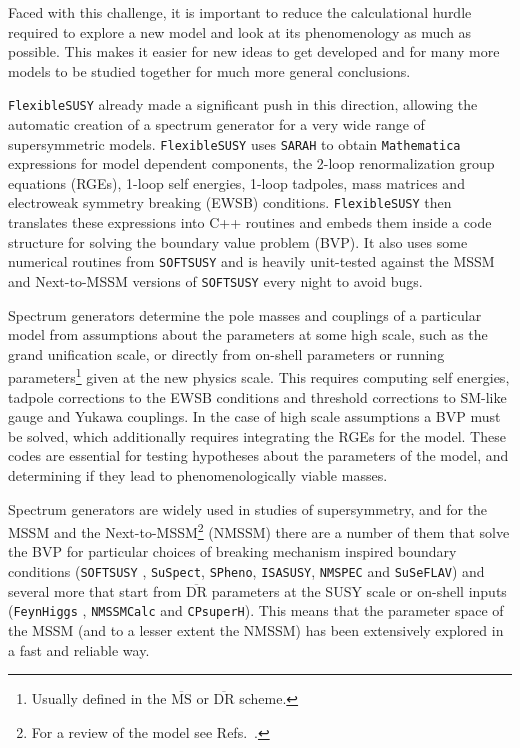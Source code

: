 \documentclass[final,3p,11pt,pdflatex]{elsarticle}
\makeatletter
\newcommand{\sarah}{\texttt{SARAH}\@\xspace}
\newcommand{\spheno}{\texttt{SPheno}\@\xspace}
\newcommand{\suspect}{\texttt{SuSpect}\@\xspace}
\newcommand{\isasusy}{\texttt{ISASUSY}\@\xspace}
\newcommand{\suseflav}{\texttt{SuSeFLAV}\@\xspace}
\newcommand{\nmspec}{\texttt{NMSPEC}\@\xspace}
\newcommand{\fs}{\texttt{FlexibleSUSY}\@\xspace}
\newcommand{\softsusy}{\texttt{SOFTSUSY}\@\xspace}
\newcommand{\FeynHiggs}{\texttt{FeynHiggs}\@\xspace}
\newcommand{\NMSSMCalc}{\texttt{NMSSMCalc}\@\xspace}
\newcommand{\CPsuperH}{\texttt{CPsuperH}\@\xspace}
\newcommand{\mathematica}{\texttt{Ma\-the\-ma\-ti\-ca}\xspace}
\newcommand{\ol}[1]{\overline{#1}}
\newcommand{\MSbar}{\ensuremath{\ol{\text{MS}}}\xspace}
\newcommand{\DRbar}{\ensuremath{\ol{\text{DR}}}\xspace}
\makeatother
\begin{document}
Faced with this challenge, it is important to reduce
the calculational hurdle required to explore a new model and
look at its phenomenology as much as possible. This makes it easier for
new ideas to get developed and for many more models to
be studied together for much more general conclusions.

\fs \cite{Athron:2014yba,Athron:2016fuq} already made a significant
push in this direction, allowing the automatic creation of a spectrum
generator for a very wide range of supersymmetric models.  \fs uses
\sarah \cite{Staub:2010ty,Staub:2009bi,Staub:2010jh,Staub:2012pb,
  Staub:2013tta} to obtain \mathematica expressions for model dependent
components, the 2-loop renormalization group equations (RGEs),
1-loop self energies, 1-loop tadpoles, mass matrices and
electroweak symmetry breaking (EWSB) conditions. \fs then translates these
expressions into C++ routines and embeds them inside a code structure
for solving the boundary value problem (BVP)\@.  It also uses some numerical
routines from \softsusy \cite{Allanach:2001kg,Allanach:2013kza} and is
heavily unit-tested against the MSSM and Next-to-MSSM versions of
\softsusy every night to avoid bugs.


Spectrum generators determine the pole masses and couplings of a
particular model from assumptions about the parameters at some
high scale, such as the grand unification scale, or directly from
on-shell parameters or running parameters\footnote{Usually defined in
  the \MSbar or \DRbar scheme.} given at the new physics scale.
This requires computing self energies, tadpole corrections to the EWSB
conditions and threshold corrections to SM-like gauge and Yukawa
couplings.  In the case of high scale assumptions a BVP must be
solved, which additionally requires integrating the RGEs for the model.
These codes are essential for testing hypotheses about the parameters of
the model, and determining if they lead to phenomenologically viable masses.

Spectrum generators are widely used in studies of supersymmetry, and for the
MSSM and the Next-to-MSSM\footnote{For a review of the model see
  Refs.\ \cite{Ellwanger:2009dp, Maniatis:2009re}.} (NMSSM) there are
a number of them that solve the BVP for particular choices of breaking
mechanism inspired boundary conditions (\softsusy
\cite{Allanach:2001kg,Allanach:2009bv, Allanach:2011de,
  Allanach:2013kza, Allanach:2014nba,
  Allanach:2016rxd,Allanach:2017hcf}, \suspect \cite{Djouadi:2002ze},
\spheno \cite{Porod:2003um,Porod:2011nf}, \isasusy \cite{Baer:1993ae},
\nmspec \cite{Ellwanger:2004xm,Ellwanger:2005dv, Ellwanger:2006rn} and
\suseflav \cite{Chowdhury:2011zr}) and several more that start from \DRbar
parameters at the SUSY scale or on-shell inputs (\FeynHiggs
\cite{Heinemeyer:1998yj, Heinemeyer:1998np, Degrassi:2002fi,
  Frank:2006yh, Hahn:2013ria, Drechsel:2016jdg, Bahl:2016brp,
  Bahl:2017aev}, \NMSSMCalc \cite{Baglio:2013iia, King:2015oxa} and
\CPsuperH \cite{Lee:2003nta, Lee:2007gn, Lee:2012wa}). This means that
the parameter space of the MSSM (and to a lesser extent the NMSSM) has
been extensively explored in a fast and reliable way.
\end{document}
